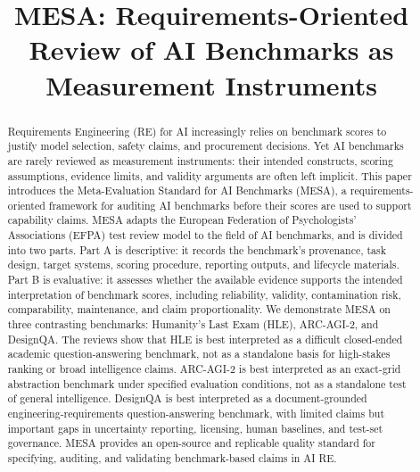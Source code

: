 \documentclass[conference]{IEEEtran}
\begin{document}
\title{MESA: Requirements-Oriented Review of AI Benchmarks as Measurement Instruments}

\author{
\and
{}
}

\maketitle
\thispagestyle{plain}
\pagestyle{plain}

\begin{abstract}
Requirements Engineering (RE) for AI increasingly relies on benchmark scores to justify model selection, safety claims, and procurement decisions. Yet AI benchmarks are rarely reviewed as measurement instruments: their intended constructs, scoring assumptions, evidence limits, and validity arguments are often left implicit. This paper introduces the Meta-Evaluation Standard for AI Benchmarks (MESA), a requirements-oriented framework for auditing AI benchmarks before their scores are used to support capability claims. MESA adapts the European Federation of Psychologists' Associations (EFPA) test review model to the field of AI benchmarks, and is divided into two parts. Part A is descriptive: it records the benchmark's provenance, task design, target systems, scoring procedure, reporting outputs, and lifecycle materials. Part B is evaluative: it assesses whether the available evidence supports the intended interpretation of benchmark scores, including reliability, validity, contamination risk, comparability, maintenance, and claim proportionality. We demonstrate MESA on three contrasting benchmarks: Humanity's Last Exam (HLE), ARC-AGI-2, and DesignQA. The reviews show that HLE is best interpreted as a difficult closed-ended academic question-answering benchmark, not as a standalone basis for high-stakes ranking or broad intelligence claims. ARC-AGI-2 is best interpreted as an exact-grid abstraction benchmark under specified evaluation conditions, not as a standalone test of general intelligence. DesignQA is best interpreted as a document-grounded engineering-requirements question-answering benchmark, with limited claims but important gaps in uncertainty reporting, licensing, human baselines, and test-set governance. MESA provides an open-source and replicable quality standard for specifying, auditing, and validating benchmark-based claims in AI RE.
\end{abstract}
\end{document}
